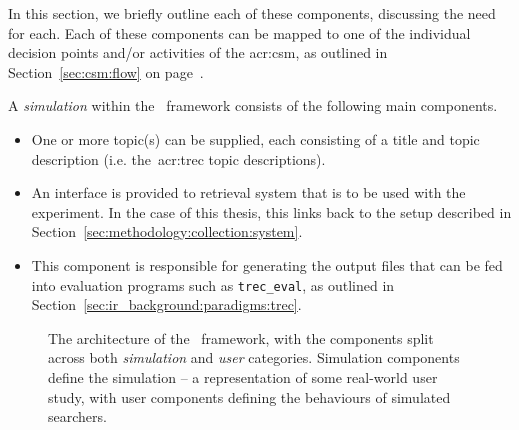 In this section, we briefly outline each of these components, discussing the need for each. Each of these components can be mapped to one of the individual decision points and/or activities of the \gls{acr:csm}, as outlined in Section~\ref{sec:csm:flow} on page~\pageref{sec:csm:flow}.

A \emph{simulation} within the \simiir~framework consists of the following main components.

\begin{itemize}
    \item{ One or more topic(s) can be supplied, each consisting of a title and topic description (i.e. the~\gls{acr:trec} topic descriptions).}
    \item{ An interface is provided to retrieval system that is to be used with the experiment. In the case of this thesis, this links back to the setup described in Section~\ref{sec:methodology:collection:system}.}
    \item{ This component is responsible for generating the output files that can be fed into evaluation programs such as \texttt{trec\_eval}, as outlined in Section~\ref{sec:ir_background:paradigms:trec}.}
\end{itemize}

\begin{figure}[t!]
    \centering
    \caption[Architecture of the \simiir~framework]{The architecture of the \simiir~framework, with the components split across both \emph{simulation} and \emph{user} categories. Simulation components define the simulation – a representation of some real-world user study, with user components defining the behaviours of simulated searchers.}
    \label{fig:simiir}
\end{figure}

